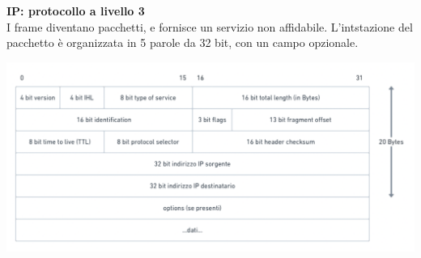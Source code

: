 \documentclass[11pt, oneside]{article}   	%
\begin{document}
\textbf{IP: protocollo a livello 3}\\
I frame diventano pacchetti, e fornisce un servizio non affidabile. L'intstazione del pacchetto è organizzata in 5 parole da 32 bit, con un campo opzionale.
\begin{center}
\includegraphics[scale=0.5]{ip}
\end{center}
\end{document}
